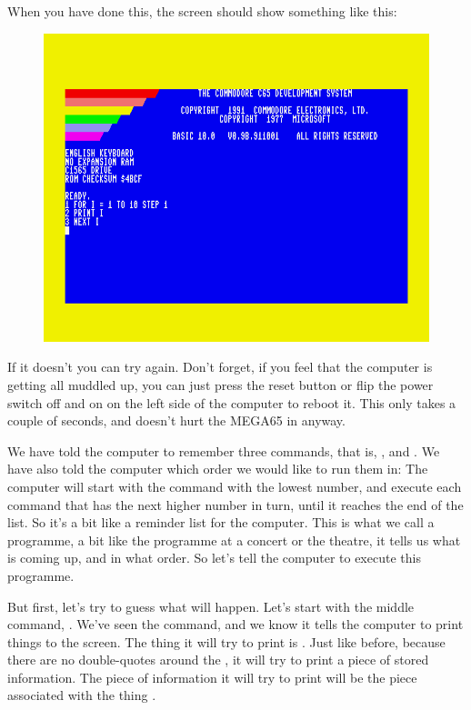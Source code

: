 When you have done this, the screen should show something like this:

\setlength{\intextsep}{0pt}%
  \begin{figure}
    \includegraphics[width=\linewidth]{images/first-steps-for-loop-programme-1.png}
  \end{figure}

If it doesn't you
can try again. Don't forget, if you feel that the computer is getting all muddled up,
you can just press the reset button or flip the power switch off and on on the left side of the
computer to reboot it. This only takes a couple of seconds, and doesn't hurt the MEGA65
in anyway.

We have told the computer to remember three commands, that is, ,
and .  We have also told the computer which order we would like to run them in: The
computer will start with the command with the lowest number, and execute each command that
has the next higher number in turn, until it reaches the end of the list.  So it's a bit like
a reminder list for the computer. This is what we call a programme, a bit like the programme at
a concert or the theatre, it tells us what is coming up, and in what order.
So let's tell the computer to execute this programme.

But first, let's try to guess what will happen.  Let's start with the middle command, .
We've seen the  command, and we know it tells the computer to print things to the screen.
The thing it will try to print is .  Just like before, because there are no double-quotes
around the , it will try to print a piece of stored information.  The piece of information
it will try to print will be the piece associated with the thing .

